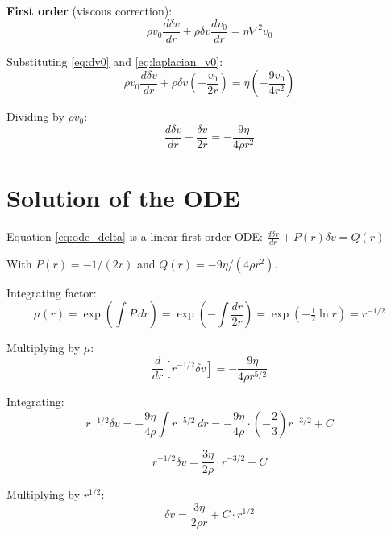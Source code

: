 \documentclass[12pt,a4paper,openany]{book}
\theoremstyle{definition}
\theoremstyle{plain}
\theoremstyle{remark}
\begin{document}
\textbf{First order} (viscous correction):
\begin{equation}
\rho v_0 \frac{d\delta v}{dr} + \rho \delta v \frac{dv_0}{dr} = \eta \nabla^2 v_0
\label{eq:first_order}
\end{equation}

Substituting \cref{eq:dv0} and \cref{eq:laplacian_v0}:
\begin{equation}
\rho v_0 \frac{d\delta v}{dr} + \rho \delta v \left(-\frac{v_0}{2r}\right) = \eta \left(-\frac{9v_0}{4r^2}\right)
\end{equation}

Dividing by $\rho v_0$:
\begin{equation}
\frac{d\delta v}{dr} - \frac{\delta v}{2r} = -\frac{9\eta}{4\rho r^2}
\label{eq:ode_delta}
\end{equation}

\section{Solution of the ODE}

Equation \cref{eq:ode_delta} is a linear first-order ODE: $\frac{d\delta v}{dr} + P(r)\delta v = Q(r)$

With $P(r) = -1/(2r)$ and $Q(r) = -9\eta/(4\rho r^2)$.

Integrating factor:
\begin{equation}
\mu(r) = \exp\left(\int P\,dr\right) = \exp\left(-\int \frac{dr}{2r}\right) = \exp(-\tfrac{1}{2}\ln r) = r^{-1/2}
\label{eq:integrating_factor}
\end{equation}

Multiplying by $\mu$:
\begin{equation}
\frac{d}{dr}\left[r^{-1/2}\delta v\right] = -\frac{9\eta}{4\rho r^{5/2}}
\end{equation}

Integrating:
\begin{equation}
r^{-1/2}\delta v = -\frac{9\eta}{4\rho}\int r^{-5/2}\,dr = -\frac{9\eta}{4\rho} \cdot \left(-\frac{2}{3}\right)r^{-3/2} + C
\end{equation}

\begin{equation}
r^{-1/2}\delta v = \frac{3\eta}{2\rho} \cdot r^{-3/2} + C
\end{equation}

Multiplying by $r^{1/2}$:
\begin{equation}
\delta v = \frac{3\eta}{2\rho r} + C \cdot r^{1/2}
\label{eq:delta_v_general}
\end{equation}
\end{document}
